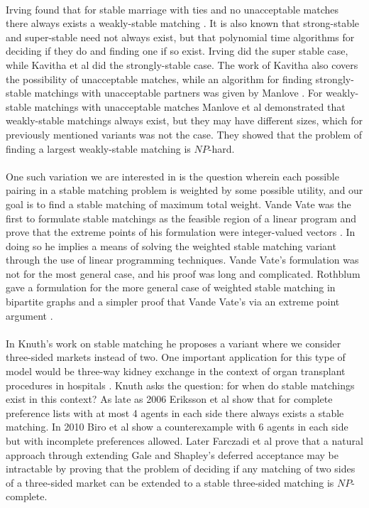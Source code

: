 \paragraph{}
Irving found that for stable marriage with ties and no unacceptable matches there always exists a weakly-stable matching \cite{irving1994stable}. It is also known that strong-stable and super-stable need not always exist, but that polynomial time algorithms for deciding if they do and finding one if so exist. Irving did the super stable case, while Kavitha et al \cite{kavitha2004strongly} did the strongly-stable case. The work of Kavitha also covers the possibility of unacceptable matches, while an algorithm for finding strongly-stable matchings with unacceptable partners was given by Manlove \cite{manlove1999stable}. For weakly-stable matchings with unacceptable matches Manlove et al \cite{manlove2002hard} demonstrated that weakly-stable matchings always exist, but they may have different sizes, which for previously mentioned variants was not the case. They showed that the problem of finding a largest weakly-stable matching is $NP$-hard.
\paragraph{}
One such variation we are interested in is the question wherein each possible pairing in a stable matching problem is weighted by some possible utility, and our goal is to find a stable matching of maximum total weight. Vande Vate was the first to formulate stable matchings as the feasible region of a linear program and prove that the extreme points of his formulation were integer-valued vectors \cite{vate1989linear}. In doing so he implies a means of solving the weighted stable matching variant through the use of linear programming techniques. Vande Vate's formulation was not for the most general case, and his proof was long and complicated. Rothblum gave a formulation for the more general case of weighted stable matching in bipartite graphs and a simpler proof that Vande Vate's via an extreme point argument \cite{rothblum1992characterization}.
\paragraph{}
In Knuth's work on stable matching he proposes a variant where we consider three-sided markets instead of two. One important application for this type of model would be three-way kidney exchange in the context of organ transplant procedures in hospitals \cite{saidman2006increasing}. Knuth asks the question: for when do stable matchings exist in this context? As late as 2006 Eriksson et al \cite{eriksson2006three} show that for complete preference lists with at most 4 agents in each side there always exists a stable matching. In 2010 Biro et al \cite{biro2010three} show a counterexample with 6 agents in each side but with incomplete preferences allowed. Later Farczadi et al \cite{farczadi2014stable} prove that a natural approach through extending Gale and Shapley's deferred acceptance may be intractable by proving that the problem of deciding if any matching of two sides of a three-sided market can be extended to a stable three-sided matching is $NP$-complete.

